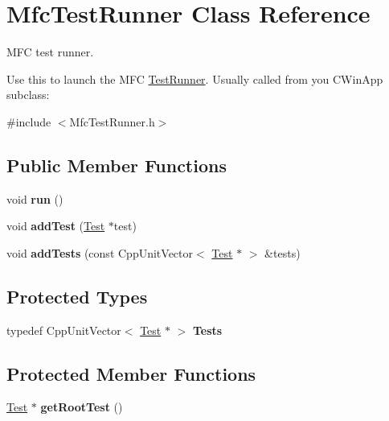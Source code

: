 \hypertarget{class_mfc_test_runner}{\section{Mfc\-Test\-Runner Class Reference}
\label{class_mfc_test_runner}
}


M\-F\-C test runner.

Use this to launch the M\-F\-C \hyperlink{class_test_runner}{Test\-Runner}. Usually called from you C\-Win\-App subclass\-:  




{\ttfamily \#include $<$Mfc\-Test\-Runner.\-h$>$}

\subsection*{Public Member Functions}
\begin{DoxyCompactItemize}
\item 
\hypertarget{class_mfc_test_runner_aea503f886c3a992b557d4dfc223bb0b2}{void {\bfseries run} ()}\label{class_mfc_test_runner_aea503f886c3a992b557d4dfc223bb0b2}

\item 
\hypertarget{class_mfc_test_runner_aedb029517afb5863e483bf9ff0d7d1ed}{void {\bfseries add\-Test} (\hyperlink{class_test}{Test} $\ast$test)}\label{class_mfc_test_runner_aedb029517afb5863e483bf9ff0d7d1ed}

\item 
\hypertarget{class_mfc_test_runner_a99c469dd7f65c820a378e217ca886fd9}{void {\bfseries add\-Tests} (const Cpp\-Unit\-Vector$<$ \hyperlink{class_test}{Test} $\ast$ $>$ \&tests)}\label{class_mfc_test_runner_a99c469dd7f65c820a378e217ca886fd9}

\end{DoxyCompactItemize}
\subsection*{Protected Types}
\begin{DoxyCompactItemize}
\item 
\hypertarget{class_mfc_test_runner_a6911063cb903f782927897e33df1692f}{typedef Cpp\-Unit\-Vector$<$ \hyperlink{class_test}{Test} $\ast$ $>$ {\bfseries Tests}}\label{class_mfc_test_runner_a6911063cb903f782927897e33df1692f}

\end{DoxyCompactItemize}
\subsection*{Protected Member Functions}
\begin{DoxyCompactItemize}
\item 
\hypertarget{class_mfc_test_runner_ad810643faf74943741660ca94b9811ee}{\hyperlink{class_test}{Test} $\ast$ {\bfseries get\-Root\-Test} ()}\label{class_mfc_test_runner_ad810643faf74943741660ca94b9811ee}

\end{DoxyCompactItemize}
